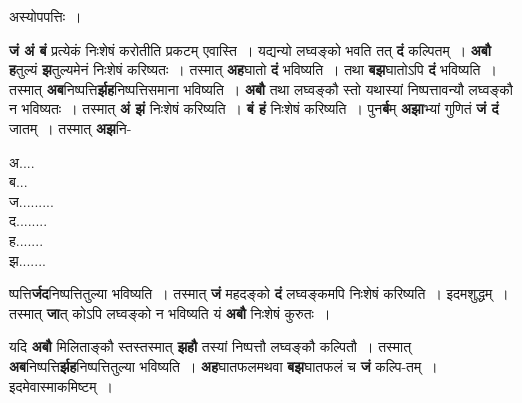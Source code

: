 \documentclass[11pt, openany]{book}
\begin{document}
\begin{center}
अस्योपपत्तिः~। 
\end{center}

\begin{flushleft}
\begin{minipage}[t]{0.75\textwidth}
\hspace{4mm} \textbf{जं अं बं} प्रत्येकं निःशेषं करोतीति प्रकटम् एवास्ति~। यद्यन्यो लघ्वङ्को भवति तत् \textbf{दं} कल्पितम्~। \textbf{अबौ ह}तुल्यं \textbf{झ}तुल्यमेनं निःशेषं करिष्यतः~। तस्मात् \textbf{अह}घातो \textbf{दं} भविष्यति~। तथा \textbf{बझ}घातोऽपि \textbf{दं} भविष्यति~। तस्मात् \textbf{अब}निष्पत्ति\textbf{र्झह}निष्पत्तिसमाना भविष्यति~। \textbf{अबौ} तथा लघ्वङ्कौ स्तो यथास्यां निष्पत्तावन्यौ लघ्वङ्कौ न भविष्यतः~। तस्मात् \textbf{अं झं} निःशेषं करिष्यति~। \textbf{बं हं} निःशेषं करिष्यति~। पुन\textbf{र्ब}म् \textbf{अझा}भ्यां गुणितं \textbf{जं दं} जातम्~। तस्मात् \textbf{अझ}नि-
\end{minipage} 
\hfill
\begin{minipage}[t]{0.15\textwidth}
अ....\\
ब...\\
ज.........\\
द........\\
ह.......\\
झ.......
\end{minipage}
\end{flushleft}

\newpage
\noindent ष्पत्ति\textbf{र्जद}निष्पत्तितुल्या भविष्यति~। तस्मात् \textbf{जं} महदङ्को \textbf{दं} लघ्वङ्कमपि निःशेषं करिष्यति~। इदमशुद्धम्~। तस्मात् \textbf{जा}त् कोऽपि लघ्वङ्को न भविष्यति यं \textbf{अबौ} निःशेषं कुरुतः~। \\
\vspace{-1mm}

 यदि \textbf{अबौ} मिलिताङ्कौ स्तस्तस्मात् \textbf{झहौ} तस्यां निष्पत्तौ लघ्वङ्कौ कल्पितौ~। तस्मात् \textbf{अब}निष्पत्ति\textbf{र्झह}निष्पत्तितुल्या भविष्यति~। \textbf{अह}घातफलमथवा \textbf{बझ}घातफलं च \textbf{जं} कल्पि-तम्~। इदमेवास्माकमिष्टम्~। \\
\vspace{-1mm}
\end{document}

